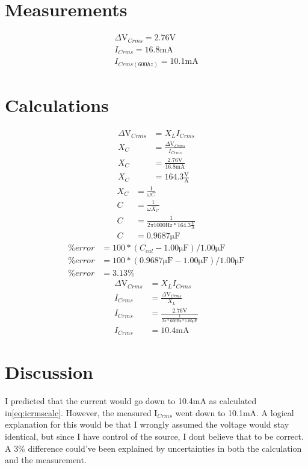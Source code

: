 \documentclass{report}
\begin{document}
\section{Measurements}

\begin{gather}
    \Delta\si{\volt}_{Crms}=2.76\si{\volt}\\
    I_{Crms}=16.8\si{\milli\ampere}\\
    I_{Crms(600hz)}=10.1\si{\milli\ampere}
\end{gather}

\section{ Calculations}

\begin{align}
    \Delta\si{\volt}_{Crms}&=X_{L}I_{Crms}\nonumber\\
    X_{C}&=\frac{\Delta\si{\volt}_{Crms}}{I_{Crms}}\nonumber\\
    X_{C}&=\frac{2.76\si{\volt}}{16.8\si{\milli\ampere}}\nonumber\\
    X_{C}&=164.3\frac{\si{\volt}}{\si{\ampere}}\label{eq:xccalc}
\end{align}
\begin{align}
    X_{C}&=\frac{1}{\omega C}\nonumber\\
    C&=\frac{1}{\omega X_{C}}\nonumber\\
    C&=\frac{1}{2\pi1000\si{\hertz}*164.3\frac{\si{\volt}}{\si{\ampere}}}\nonumber\\
    C&=0.9687\si{\micro\farad}
\end{align}
\begin{align}
    \%error&=100 * (C_{cal} - 1.00\si{\micro\farad})/1.00\si{\micro\farad}\nonumber\\
    \%error&=100 * (0.9687\si{\micro\farad} - 1.00\si{\micro\farad})/1.00\si{\micro\farad}\nonumber\\
    \%error&=3.13\%
\end{align}
\begin{align}
    \Delta\si{\volt}_{Crms}&=X_{L}I_{Crms}\nonumber\\
    I_{Crms}&=\frac{\Delta\si{\volt}_{Crms}}{X_{L}}\nonumber\\
    I_{Crms}&=\frac{2.76\si{\volt}}{\frac{1}{2\pi*600\si{\hertz}*1.00\si{\micro\farad}}}\nonumber\\
    I_{Crms}&=10.4\si{\milli\ampere}\label{eq:icrmscalc}
\end{align}

\section{Discussion}

I predicted that the current would go down to 10.4\si{\milli\ampere} as calculated in\eqref{eq:icrmscalc}. However, the measured I$_{Crms}$ went down to 10.1mA. A logical explanation for this would be that I wrongly assumed the voltage would stay identical, but since I have control of the source, I dont believe that to be correct. A 3\% difference could've been explained by uncertainties in both the calculation and the measurement.
\end{document}
